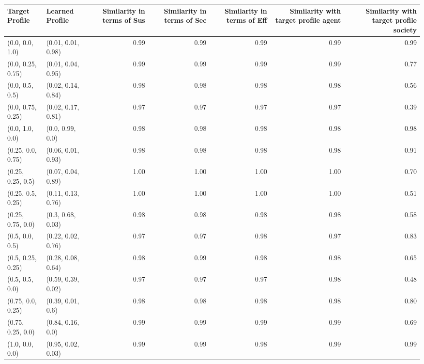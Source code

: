 \begin{tabular}{llrrrrr}
\toprule
Target Profile & Learned Profile & Similarity in terms of Sus & Similarity in terms of Sec & Similarity in terms of Eff & Similarity with target profile agent & Similarity with target profile society \\
\midrule
(0.0, 0.0, 1.0) & (0.01, 0.01, 0.98) & 0.99 & 0.99 & 0.99 & 0.99 & 0.99 \\
(0.0, 0.25, 0.75) & (0.01, 0.04, 0.95) & 0.99 & 0.99 & 0.99 & 0.99 & 0.77 \\
(0.0, 0.5, 0.5) & (0.02, 0.14, 0.84) & 0.98 & 0.98 & 0.98 & 0.98 & 0.56 \\
(0.0, 0.75, 0.25) & (0.02, 0.17, 0.81) & 0.97 & 0.97 & 0.97 & 0.97 & 0.39 \\
(0.0, 1.0, 0.0) & (0.0, 0.99, 0.0) & 0.98 & 0.98 & 0.98 & 0.98 & 0.98 \\
(0.25, 0.0, 0.75) & (0.06, 0.01, 0.93) & 0.98 & 0.98 & 0.98 & 0.98 & 0.91 \\
(0.25, 0.25, 0.5) & (0.07, 0.04, 0.89) & 1.00 & 1.00 & 1.00 & 1.00 & 0.70 \\
(0.25, 0.5, 0.25) & (0.11, 0.13, 0.76) & 1.00 & 1.00 & 1.00 & 1.00 & 0.51 \\
(0.25, 0.75, 0.0) & (0.3, 0.68, 0.03) & 0.98 & 0.98 & 0.98 & 0.98 & 0.58 \\
(0.5, 0.0, 0.5) & (0.22, 0.02, 0.76) & 0.97 & 0.97 & 0.98 & 0.97 & 0.83 \\
(0.5, 0.25, 0.25) & (0.28, 0.08, 0.64) & 0.98 & 0.99 & 0.98 & 0.98 & 0.65 \\
(0.5, 0.5, 0.0) & (0.59, 0.39, 0.02) & 0.97 & 0.97 & 0.97 & 0.98 & 0.48 \\
(0.75, 0.0, 0.25) & (0.39, 0.01, 0.6) & 0.98 & 0.98 & 0.98 & 0.98 & 0.80 \\
(0.75, 0.25, 0.0) & (0.84, 0.16, 0.0) & 0.99 & 0.99 & 0.99 & 0.99 & 0.69 \\
(1.0, 0.0, 0.0) & (0.95, 0.02, 0.03) & 0.99 & 0.99 & 0.98 & 0.99 & 0.99 \\
\bottomrule
\end{tabular}
